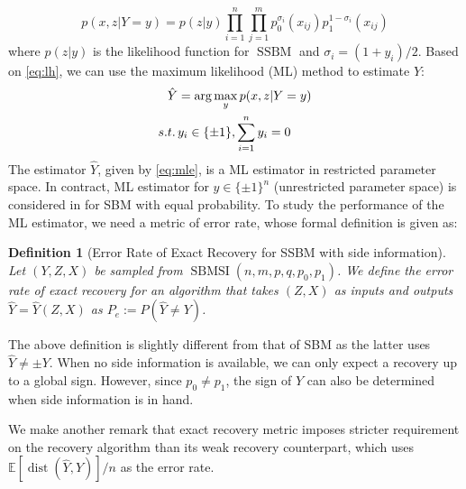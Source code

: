\documentclass[conference]{IEEEtran}
\newtheorem{definition}{Definition}
\DeclareMathOperator{\SSBM}{SSBM}
\DeclareMathOperator{\SBMSI}{SBMSI}
\DeclareMathOperator{\dist}{dist}
\begin{document}
\begin{equation}\label{eq:lh}
    p(x, z| Y=y) = p(z|y)\prod_{i=1}^n \prod_{j=1}^m p^{\sigma_i}_0(x_{ij})p^{1-\sigma_i}_1(x_{ij}) 
\end{equation}
where $p(z|y)$ is the likelihood function for $\SSBM$ and $\sigma_i = (1+y_i)/2$.
Based on \eqref{eq:lh}, we can use the maximum likelihood (ML) method to estimate
$Y$:
\begin{align}
    \hat{Y} &= \arg\max_y p(x,z|Y=y) \notag \\
    s.t.\, & y_i \in \{\pm 1\}, \sum_{i=1}^n y_i=0 \label{eq:mle}
\end{align}
The estimator $\hat{Y}$, given by \eqref{eq:mle}, is a ML estimator in restricted parameter space.
In contract, ML estimator for $y\in \{ \pm 1 \}^n$ (unrestricted parameter space) is considered in \cite{abbe17sideinfo} for SBM with equal probability.
To study the performance of the ML estimator, we need a metric of error rate,
whose formal definition is given as:
\begin{definition}[Error Rate of Exact Recovery for SSBM with side information]
		Let $(Y,Z,X)$ be sampled from $\SBMSI(n,m,p,q,p_0, p_1)$.
		We define the error rate of exact recovery for an algorithm that takes $(Z,X)$ as inputs and outputs $\hat{Y}=\hat{Y}(Z,X)$ as
		$P_e:=P(\hat{Y} \neq Y)$.
\end{definition}
The above definition is slightly different from that of SBM as the latter uses $\hat{Y} \neq \pm Y$.
When no side information is available, we can only expect a recovery up to a global sign. However,
since $p_0 \neq p_1$, the sign of $Y$ can also be determined when side information is in hand.

We make another remark that exact recovery metric imposes stricter requirement on the recovery algorithm than its weak recovery
counterpart, which uses $\mathbb{E}[\dist(\hat{Y}, Y)]/n$ as the error rate.
\end{document}
